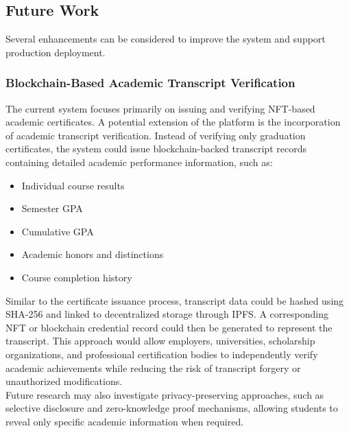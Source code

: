 \subsection{Future Work}

    Several enhancements can be considered to improve the system and support production deployment.

    

    \subsubsection{Blockchain-Based Academic Transcript Verification}
    
    The current system focuses primarily on issuing and verifying NFT-based academic certificates. A potential extension of the platform is the incorporation of academic transcript verification. Instead of verifying only graduation certificates, the system could issue blockchain-backed transcript records containing detailed academic performance information, such as:

    \begin{itemize}
        \item Individual course results
        
        \item Semester GPA
        
        \item Cumulative GPA
        
        \item Academic honors and distinctions
        
        \item Course completion history
    \end{itemize}

    Similar to the certificate issuance process, transcript data could be hashed using SHA-256 and linked to decentralized storage through IPFS. A corresponding NFT or blockchain credential record could then be generated to represent the transcript. This approach would allow employers, universities, scholarship organizations, and professional certification bodies to independently verify academic achievements while reducing the risk of transcript forgery or unauthorized modifications.\\
    
    Future research may also investigate privacy-preserving approaches, such as selective disclosure and zero-knowledge proof mechanisms, allowing students to reveal only specific academic information when required.
    

